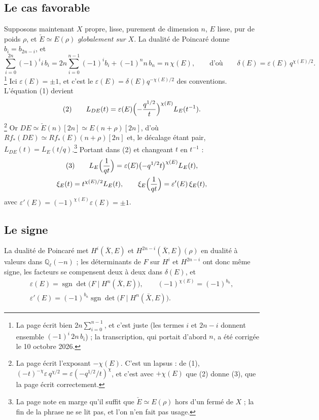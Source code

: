 \documentclass[11pt,a4paper]{article}
\begin{document}
\subsection*{Le cas favorable}

Supposons maintenant $X$ propre, lisse, purement de dimension $n$, $E$ lisse,
pur de poids $\rho$, et $\check E \simeq E(\rho)$ \emph{globalement sur $X$}.
La dualité de Poincaré donne $b_i = b_{2n-i}$, et
\[
  \sum_{i=0}^{2n} (-1)^i i\,b_i
  = 2n\sum_{i=0}^{n-1}(-1)^i b_i + (-1)^n n\,b_n = n\,\chi(E),
  \qquad\text{d'où}\qquad
  \delta(E) = \varepsilon(E)\,q^{\chi(E)/2} .
\]
\footnote{La page écrit bien $2n\sum_{i=0}^{n-1}$, et c'est juste (les termes
$i$ et $2n - i$ donnent ensemble $(-1)^i\,2n\,b_i$) ; la transcription,
qui portait d'abord $n$, a été corrigée le 10 octobre 2026.} Ici $\varepsilon(E) = \pm 1$, et
c'est le $\varepsilon(E) = \delta(E)q^{-\chi(E)/2}$ des conventions. L'équation (1)
devient
\[
  \text{(2)}\qquad
  L_{DE}(t) = \varepsilon(E)\Bigl(-\frac{q^{1/2}}{t}\Bigr)^{\chi(E)} L_E(t^{-1}) .
\]
\footnote{La page écrit l'exposant $-\chi(E)$. C'est un lapsus : de (1),
$(-t)^{-\chi}\varepsilon\,q^{\chi/2} = \varepsilon(-q^{1/2}/t)^{\chi}$, et
c'est avec $+\chi(E)$ que (2) donne (3), que la page écrit correctement.}
Or $DE \simeq \check E(n)[2n] \simeq E(n + \rho)[2n]$, d'où
$Rf_{*}(DE) \simeq Rf_{*}(E)(n + \rho)[2n]$ et, le décalage étant pair,
$L_{DE}(t) = L_E(t/q)$.\footnote{La page note en marge qu'il suffit que
$\check E \simeq E(\rho)$ hors d'un fermé de $X$ ; la fin de la phrase ne se
lit pas, et l'on n'en fait pas usage.} Portant dans (2) et changeant $t$ en
$t^{-1}$ :
\[
  \begin{gathered}
  \text{(3)}\qquad
  L_E\Bigl(\frac{1}{qt}\Bigr) = \varepsilon(E)\bigl(-q^{1/2}t\bigr)^{\chi(E)}L_E(t),\\
  \xi_E(t) = t^{\chi(E)/2}L_E(t), \qquad
  \xi_E\Bigl(\frac{1}{qt}\Bigr) = \varepsilon'(E)\,\xi_E(t),
  \end{gathered}
\]
avec $\varepsilon'(E) = (-1)^{\chi(E)}\varepsilon(E) = \pm 1$.

\subsection*{Le signe}

La dualité de Poincaré met $H^i(\bar X, E)$ et $H^{2n-i}(\bar X, E)(\rho)$ en
dualité à valeurs dans $\mathbb{Q}_\ell(-n)$ ; les déterminants de $F$ sur
$H^i$ et $H^{2n-i}$ ont donc même signe, les facteurs se compensent deux à
deux dans $\delta(E)$, et
\[
  \begin{gathered}
  \varepsilon(E) = \operatorname{sgn}\det\bigl(F \mid H^n(\bar X, E)\bigr),
  \qquad (-1)^{\chi(E)} = (-1)^{b_n},\\
  \varepsilon'(E) = (-1)^{b_n}\operatorname{sgn}\det\bigl(F \mid H^n(\bar X, E)\bigr).
  \end{gathered}
\]
\end{document}

